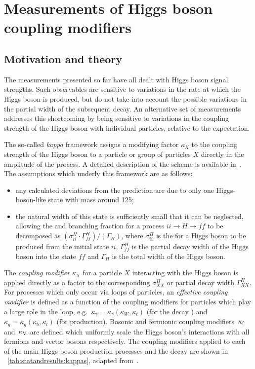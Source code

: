 \section{Measurements of Higgs boson coupling modifiers}
\label{sec:statandresults:kappas}
\subsection{Motivation and theory}

The measurements presented so far have all dealt with Higgs boson signal strengths. Such observables are sensitive to variations in the rate at which the Higgs boson is produced, but do not take into account the possible variations in the partial width of the subsequent decay. An alternative set of measurements addresses this shortcoming by being sensitive to variations in the coupling strength of the Higgs boson with individual particles, relative to the \SM expectation. 

The so-called \emph{kappa} framework assigns a modifying factor $\kappa_{X}$ to the coupling strength of the Higgs boson to a particle or group of particles $X$ directly in the amplitude of the process. A detailed description of the scheme is available in~\cite{Khachatryan:2016vau}. 
The assumptions which underly this framework are as follows: 
\begin{itemize}
\item any calculated deviations from the \SM prediction are due to only one Higgs-boson-like state with mass around 125\GeV;
\item the natural width of this state is sufficiently small that it can be neglected, allowing the \crosssection and branching fraction for a process $ii\rightarrow H \rightarrow ff$ to be decomposed as $(\sigma_{ii}^{H} \cdot \Gamma_{ff}^{H}) / (\Gamma_H)$, where $\sigma_{ii}^{H}$ is the \crosssection for a Higgs boson to be produced from the initial state $ii$, $\Gamma^{H}_{ff}$ is the partial decay width of the Higgs boson into the state $ff$ and $\Gamma_{H}$ is the total width of the Higgs boson.
\end{itemize}

The \emph{coupling modifier} $\kappa_{X}$ for a particle $X$ interacting with the Higgs boson is applied directly as a factor to the corresponding \crosssection $\sigma_{XX}^{H}$ or partial decay width $\Gamma^{H}_{XX}$. For processes which only occur via loops of particles, an \emph{effective coupling modifier} is defined as a function of the coupling modifiers for particles which play a large role in the loop, e.g.~$\kappa_{\gamma} = \kappa_{\gamma}(\kappa_W, \kappa_t) $ (for the decay \Hgg) and $\kappa_{g} = \kappa_{g}(\kappa_b, \kappa_t) $ (for \ggH production).
Bosonic and fermionic coupling modifiers $\,\kappa_\text{f}$ and $\,\kappa_\text{V}$ are defined which uniformly scale the Higgs boson's interactions with all fermions and vector bosons respectively. The coupling modifiers applied to each of the main Higgs boson production processes and the \Hgg decay are shown in \Table~\ref{tab:statandresults:kappas}, adapted from~\cite{Khachatryan:2016vau}.

